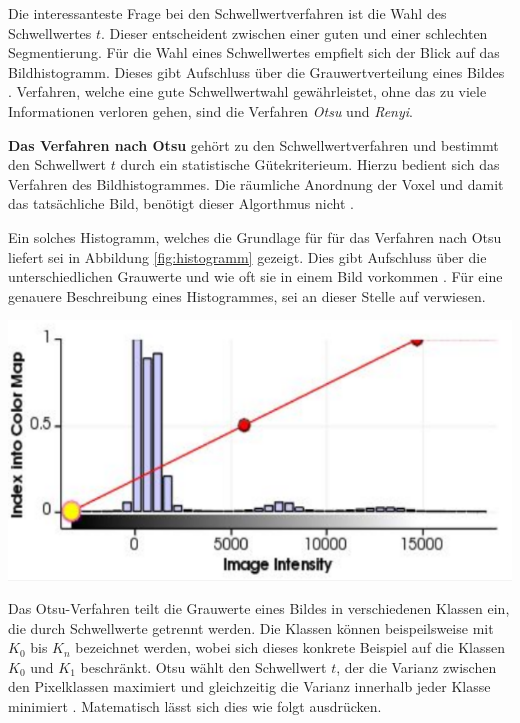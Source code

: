 Die interessanteste Frage bei den Schwellwertverfahren ist die Wahl des
Schwellwertes $t$. Dieser entscheident zwischen einer guten und einer schlechten
Segmentierung. Für die Wahl eines Schwellwertes empfielt sich der Blick auf das
Bildhistogramm. Dieses gibt Aufschluss über die Grauwertverteilung eines Bildes \citep[vgl.][Seite361]{lehmann2013bildverarbeitung}.
Verfahren, welche eine gute Schwellwertwahl gewährleistet, ohne das zu viele
Informationen verloren gehen, sind die Verfahren \textit{Otsu} und \textit{Renyi}.

\pagebreak

\textbf{Das Verfahren nach Otsu} gehört zu den Schwellwertverfahren und bestimmt
den Schwellwert $t$ durch ein statistische Gütekriterieum. Hierzu bedient sich
das Verfahren des Bildhistogrammes. Die räumliche Anordnung der Voxel und damit das
tatsächliche Bild, benötigt dieser Algorthmus nicht \citep[vgl.][Seite 264]{lehmann2013bildverarbeitung}.

\begin{minipage}{0.40\textwidth}
	Ein solches Histogramm, welches die Grundlage für für das Verfahren nach Otsu
	liefert sei in Abbildung \ref{fig:histogramm} gezeigt. Dies gibt Aufschluss über
	die unterschiedlichen Grauwerte und wie oft sie in einem Bild vorkommen \citep[vgl.][Seite264]{lehmann2013bildverarbeitung}.
	Für eine genauere Beschreibung eines Histogrammes, sei an dieser Stelle auf \citet[Seite42]{burger2009}
	verwiesen.
\end{minipage}
\hfill
\begin{minipage}{0.50\textwidth}
	\centering
	\includegraphics[width=1\textwidth]{img/histogramm.jpg}
	 \label{fig:histogramm}
\end{minipage}

Das Otsu-Verfahren teilt die Grauwerte eines Bildes in verschiedenen Klassen ein,
die durch Schwellwerte getrennt werden. Die Klassen können beispeilsweise mit $K_{0}$
bis $K_{n}$ bezeichnet werden, wobei sich dieses konkrete Beispiel auf die
Klassen $K_{0}$ und $K_{1}$ beschränkt. Otsu wählt den Schwellwert $t$, der die
Varianz zwischen den Pixelklassen maximiert und gleichzeitig die Varianz
innerhalb jeder Klasse minimiert \citep[vgl.][Seite264]{lehmann2013bildverarbeitung}.
Matematisch lässt sich dies wie folgt ausdrücken.

